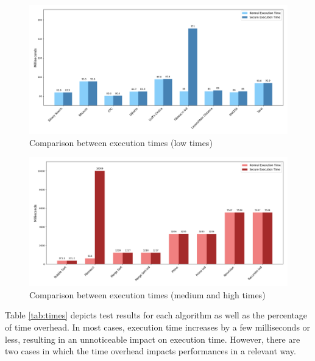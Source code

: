 \begin{figure}[htbp]
  \centering
  \includegraphics[width=\linewidth]{images/low_times.png}
  \caption{Comparison between execution times (low times)}
  \label{fig:lowtime}
\end{figure}

\begin{figure}[htbp]
  \centering
  \includegraphics[width=\linewidth]{images/high_times.png}
  \caption{Comparison between execution times (medium and high times)}
  \label{fig:hightime}
\end{figure}

Table \ref{tab:times} depicts test results for each algorithm as well as the percentage
of time overhead. In most cases, execution time increases by a few milliseconds or
less, resulting in an unnoticeable impact on execution time. However, there are
two cases in which the time overhead impacts performances in a relevant way.

